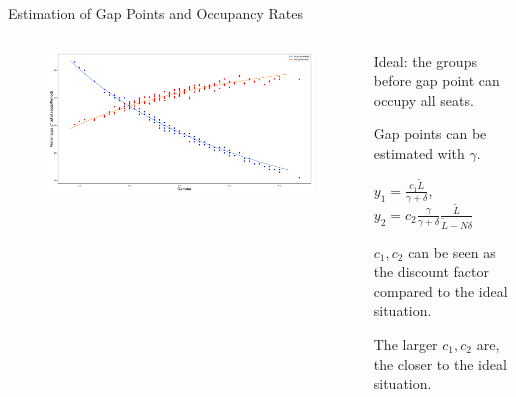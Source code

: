     \begin{frame}{Estimation of Gap Points and Occupancy Rates}
      \scriptsize
      \vspace{-0.2cm}

      \begin{columns}
        \begin{column}{0.6\textwidth}
      \begin{figure}[ht]
        \centering
        \includegraphics[width = 1\textwidth]{./images/gamma.pdf}
    \end{figure}
  \end{column}

  \begin{column}{0.4\textwidth}
    Ideal: the groups before gap point can occupy all seats.
    
    Gap points can be estimated with $\gamma$.

    {\color{blue} $y_1 = \frac{c_1 \tilde{L}}{\gamma + \delta}$}, 
    {\color{red}  $y_2 = c_2 \frac{\gamma}{\gamma + \delta} \frac{\tilde{L}}{\tilde{L}-N \delta}$}

    $c_1, c_2$ can be seen as the {\color{red} discount factor} compared to the ideal situation.

    The larger $c_1, c_2$ are, the closer to the ideal situation.
  \end{column}
  \end{columns}


\end{frame}
